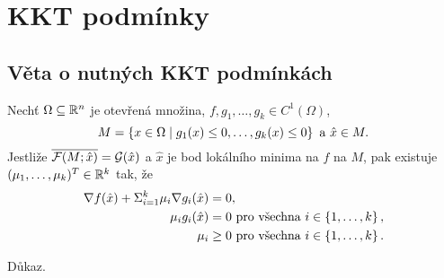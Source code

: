 \section{KKT podmínky}
\subsection{Věta o nutných KKT podmínkách}\label{KKT}
Nechť $\Omega \subseteq \mathbb{R}^n$ je otevřená množina, $f, g_1, \dots, g_k \in C^1 (\Omega)$,
\[
  M = \left\lbrace x \in \Omega \mid g_1(x) \leq 0, \dots, g_k(x) \leq 0 \right\rbrace \text{ a } \hat{x}\in M.
\]
Jestliže $\overline{\mathcal{F}(M; \hat x)} = \mathcal{G}(\hat x)$ a $\hat x$ je bod lokálního minima na $f$ na $M$, 
pak existuje ${(\mu_1, \dots, \mu_k)^T \in \mathbb{R}^k}$ tak, že 
\begin{align*}
    \nabla f(\hat x) + \Sigma_{i=1}^k \mu_i \nabla g_i(\hat x) &= 0, \\
    \mu_i g_i(\hat x) &= 0 \text{ pro všechna } i \in \left\lbrace 1, \dots, k \right\rbrace, \\
    \mu_i &\geq 0 \text{ pro všechna } i \in \left\lbrace 1, \dots, k \right\rbrace.
\end{align*}

Důkaz.

